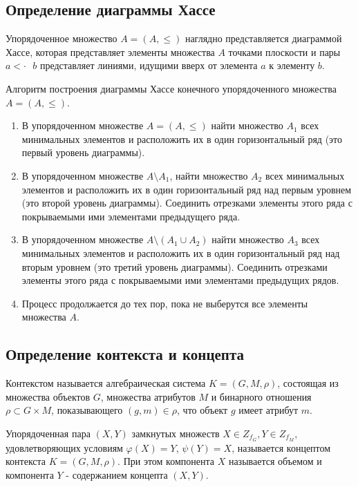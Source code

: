 \documentclass[bachelor, och, labwork]{shiza}
\begin{document}
    \subsection{Определение диаграммы Хассе}

        Упорядоченное множество $A = (A, \leq)$ наглядно представляется диаграммой Хассе, которая представляет элементы множества $A$ точками плоскости и пары $a <\cdot \text{ } b$ представляет линиями, идущими вверх от элемента $a$ к элементу $b$.

        Алгоритм построения диаграммы Хассе конечного упорядоченного множества $A = (A, \leq)$.

        \begin{enumerate}
            \item В упорядоченном множестве $A = (A, \leq)$ найти множество $A_1$ всех минимальных элементов и расположить их в один горизонтальный ряд (это первый уровень диаграммы).
            \item В упорядоченном множестве $A \setminus A_1$, найти множество $A_2$ всех минимальных элементов и
            расположить их в один горизонтальный ряд над первым уровнем (это второй уровень диаграммы). Соединить
            отрезками элементы этого ряда с покрываемыми ими элементами предыдущего ряда.
            \item В упорядоченном множестве $A \setminus (A_1 \cup A_2)$ найти множество $A_3$ всех минимальных
            элементов и расположить их в один горизонтальный ряд над вторым уровнем (это третий уровень диаграммы).
            Соединить отрезками элементы этого ряда с покрываемыми ими элементами предыдущих рядов.
            \item Процесс продолжается до тех пор, пока не выберутся все элементы множества $A$.
        \end{enumerate}

    \subsection{Определение контекста и концепта}

        Контекстом называется алгебраическая система $K = (G, M, \rho)$, состоящая из множества объектов $G$, множества атрибутов $M$ и бинарного отношения $\rho \subset G \times M$, показывающего $(g, m) \in \rho$, что объект $g$ имеет атрибут $m$.

        Упорядоченная пара $(X, Y)$ замкнутых множеств $X \in Z_{f_G}, Y \in Z_{f_M}$, удовлетворяющих условиям $\varphi(X) = Y$, $\psi(Y) = X$, называется концептом контекста $K = (G, M, \rho)$. При этом компонента $X$ называется объемом и компонента $Y$ - содержанием концепта $(X, Y)$.
\end{document}
